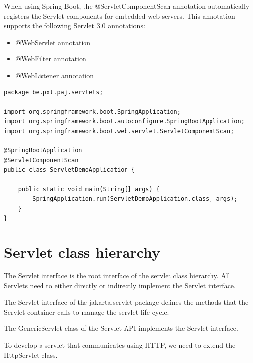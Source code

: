 When using Spring Boot, the @ServletComponentScan annotation automatically registers the Servlet components for embedded web servers. This annotation supports the following Servlet 3.0 annotations:
\begin{itemize}
\item @WebServlet annotation
\item @WebFilter annotation
\item @WebListener annotation
\end{itemize}

\begin{lstlisting}
package be.pxl.paj.servlets;

import org.springframework.boot.SpringApplication;
import org.springframework.boot.autoconfigure.SpringBootApplication;
import org.springframework.boot.web.servlet.ServletComponentScan;

@SpringBootApplication
@ServletComponentScan
public class ServletDemoApplication {

	public static void main(String[] args) {
		SpringApplication.run(ServletDemoApplication.class, args);
	}
}
\end{lstlisting}

\section{Servlet class hierarchy}

The Servlet interface is the root interface of the servlet class hierarchy. All Servlets need to either directly or indirectly implement the Servlet interface. 

The Servlet interface of the jakarta.servlet package defines the methods that the Servlet container calls to manage the servlet life cycle. 

The GenericServlet class of the Servlet API implements the Servlet interface.

To develop a servlet that communicates using HTTP, we need to extend the HttpServlet class.


